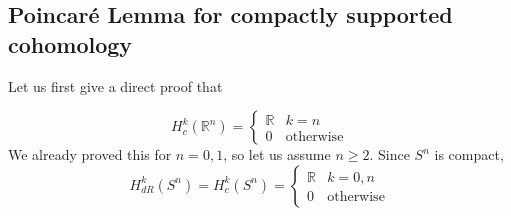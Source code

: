 \documentclass[12pt]{amsart}
\newtheorem{lemma}{Lemma}
\newcommand{\R}{\mathbb{R}} %
\theoremstyle{remark}
\begin{document}
\subsection{Poincaré Lemma for compactly supported cohomology}
Let us first give a direct proof that

\begin{equation*}
            H_{c}^k(\mathbb{R}^n)=
            \begin{cases} 
            \mathbb{R} & k=n \\
            0 & \text{otherwise}
            \end{cases}
        \end{equation*}  
%
%
We already proved this for $n=0,1$, so let us assume $n\geq 2.$ Since $S^n$ is compact,
\begin{equation*}
            H_{dR}^k(S^n)=H_c^k(S^n) = 
            \begin{cases} 
            \mathbb{R} & k=0,n \\
            0 & \text{otherwise}
            \end{cases}
        \end{equation*}  
        
\end{document}
